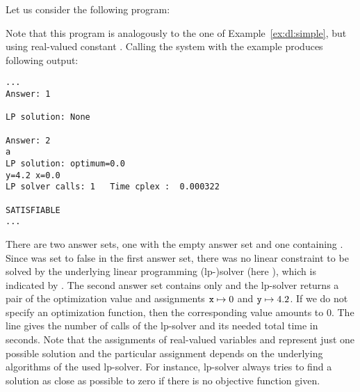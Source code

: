 \begin{example}\label{ex:lp:dl}
Let us consider the following program: 

%
Note that this program is analogously to the one of Example~\ref{ex:dl:simple}, but using real-valued constant .
%
Calling the system with the example produces following output:
\begin{lstlisting}[numbers=none]
...
Answer: 1

LP solution: None

Answer: 2
a
LP solution: optimum=0.0
y=4.2 x=0.0
LP solver calls: 1   Time cplex :  0.000322

SATISFIABLE
...
\end{lstlisting}
There are two answer sets, one with the empty answer set and one containing . 
%
Since  was set to false in the first answer set, 
there was no linear constraint to be solved by the underlying linear programming (lp-)solver (here \cplex), 
which is indicated by . 
%
The second answer set contains  only and the lp-solver returns a pair of the optimization value  and assignments $\texttt{x}\mapsto0$ and $\texttt{y}\mapsto4.2$. 
%
If we do not specify an optimization function, then the corresponding value amounts to 0.
%
The line  gives the number of calls of the lp-solver and its needed total time in seconds. 
%
Note that the assignments of real-valued variables  and  represent just one possible solution 
and the particular assignment depends on the underlying algorithms of the used lp-solver. 
%
For instance, lp-solver \cplex{} always tries to find a solution as close as possible to zero if there is no objective function given. 
\end{example}

